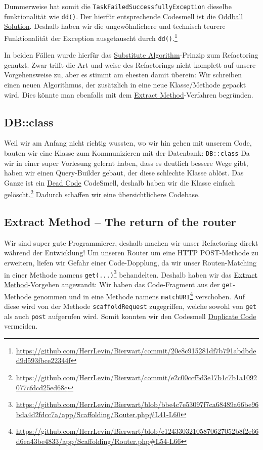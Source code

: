 \documentclass[12pt,a4paper,titlepage,ngerman,pdftex]{report}
\begin{document}
    Dummerweise hat somit die \verb|TaskFailedSuccessfullyException| dieselbe funktionalität wie \verb|dd()|.
    Der hierfür entsprechende Codesmell ist die \href{https://pragmaticways.com/31-code-smells-you-must-know/#6_Oddball_Solution}{Oddball Solution}.
    Deshalb haben wir die ungewöhnlichere und technisch teurere Funktionalität der Exception ausgetauscht durch \verb|dd()|.\footnote{\url{https://github.com/HerrLevin/Bierwart/commit/20e8c915281df7b791abdbded9d593fbce22344f}}

    In beiden Fällen wurde hierfür das \href{https://refactoring.guru/substitute-algorithm}{Substitute Algorithm}-Prinzip zum Refactoring genutzt.
    Zwar trifft die Art und weise des Refactorings nicht komplett auf unsere Vorgehensweise zu, aber es stimmt am ehesten damit überein:
    Wir schreiben einen neuen \glqq Algorithmus\grqq{}, der zusätzlich in eine neue Klasse/Methode gepackt wird.
    Dies könnte man ebenfalls mit dem \href{https://refactoring.guru/extract-method}{Extract Method}-Verfahren begründen.

    \subsection{DB::class}\label{subsec:db::class}
    Weil wir am Anfang nicht richtig wussten, wo wir hin gehen mit unserem Code, bauten wir eine Klasse zum Kommunizieren mit der Datenbank: \verb|DB::class|
    Da wir in einer super Vorlesung gelernt haben, dass es deutlich bessere Wege gibt, haben wir einen Query-Builder gebaut, der diese schlechte Klasse ablöst.
    Das Ganze ist ein \href{https://refactoring.guru/smells/dead-code}{Dead Code} CodeSmell, deshalb haben wir die Klasse einfach gelöscht.\footnote{\url{https://github.com/HerrLevin/Bierwart/commit/e2c00ccf5d3e17b1c7b1a1092077cfdcd25ed68c}}
    Dadurch schaffen wir eine übersichtlichere Codebase.
    
    \subsection{Extract Method -- The return of the router}\label{subsec:extract}
    Wir sind super gute Programmierer, deshalb machen wir unser Refactoring direkt während der Entwicklung!
    Um unseren Router um eine HTTP POST-Methode zu erweitern, liefen wir Gefahr einer Code-Dopplung, da wir unser Routen-Matching in einer Methode namens \verb|get(...)|\footnote{\url{https://github.com/HerrLevin/Bierwart/blob/bbe4c7e53097f7ca68489a66be96bda4d2fdcc7a/app/Scaffolding/Router.php\#L41-L60}} behandelten.
    Deshalb haben wir das \href{https://refactoring.guru/extract-method}{Extract Method}-Vorgehen angewandt:
    Wir haben das Code-Fragment aus der \verb|get|-Methode genommen und in eine Methode namens \verb|matchURI|\footnote{\url{https://github.com/HerrLevin/Bierwart/blob/c12433032105870627052b8f2e66d6ea43be4833/app/Scaffolding/Router.php\#L54-L66}} verschoben.
    Auf diese wird von der Methode \verb|scaffoldRequest| zugegriffen, welche sowohl von \verb|get| als auch \verb|post| aufgerufen wird.
    Somit konnten wir den Codesmell \href{https://refactoring.guru/smells/duplicate-code}{Duplicate Code} vermeiden.
\end{document}

